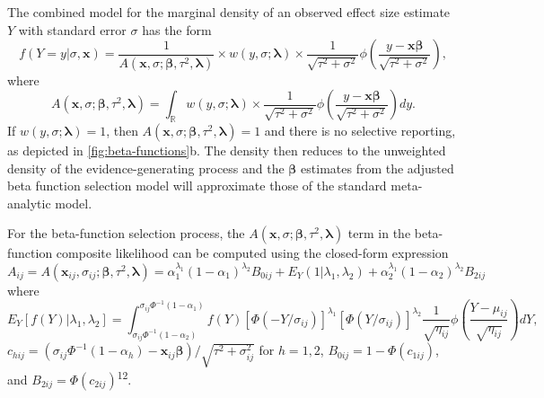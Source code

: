\documentclass[
  american,
  man, donotrepeattitle,floatsintext]{apa7}
\begin{document}
The combined model for the marginal density of an observed effect size estimate \(Y\) with standard error \(\sigma\) has the form
\begin{equation}
\label{eq:generic-selection}
f(Y = y | \sigma, \mathbf{x}) = \frac{1}{A(\mathbf{x}, \sigma; \boldsymbol\beta, \tau^2, \boldsymbol\lambda)} \times w\left(y, \sigma; \boldsymbol\lambda \right) \times \frac{1}{\sqrt{\tau^2 + \sigma^2}} \phi\left(\frac{y - \mathbf{x} \boldsymbol\beta}{\sqrt{\tau^2 + \sigma^2}}\right),
\end{equation}
where
\begin{equation}
\label{eq:generic-selection-A}
A(\mathbf{x}, \sigma; \boldsymbol\beta, \tau^2, \boldsymbol\lambda) =  \int_\mathbb{R} w\left(y, \sigma; \boldsymbol\lambda \right) \times  \frac{1}{\sqrt{\tau^2 + \sigma^2}}\phi\left(\frac{y - \mathbf{x}\boldsymbol\beta}{\sqrt{\tau^2 + \sigma^2}}\right) dy.
\end{equation}
If \(w(y, \sigma; \boldsymbol\lambda) = 1\), then \(A(\mathbf{x}, \sigma; \boldsymbol\beta, \tau^2, \boldsymbol\lambda) = 1\) and there is no selective reporting, as depicted in \ref{fig:beta-functions}b. The density then reduces to the unweighted density of the evidence-generating process and the \(\boldsymbol\beta\) estimates from the adjusted beta function selection model will approximate those of the standard meta-analytic model.

For the beta-function selection process, the \(A(\mathbf{x}, \sigma; \boldsymbol\beta, \tau^2, \boldsymbol\lambda)\) term in the beta-function composite likelihood can be computed using the closed-form expression
\begin{equation}
\label{eq:beta-function-A}
A_{ij} = A(\mathbf{x}_{ij}, \sigma_{ij}; \boldsymbol\beta, \tau^2, \boldsymbol\lambda) = \alpha_1^{\lambda_1} (1 - \alpha_1)^{\lambda_2} B_{0ij} + E_Y(1 | \lambda_1,\lambda_2) + \alpha_2^{\lambda_1} (1 - \alpha_2)^{\lambda_2} B_{2ij}
\end{equation}
where
\begin{equation}
\label{eq:beta-function-Ey}
E_Y\left[f(Y)| \lambda_1, \lambda_2\right] = \int_{\sigma_{ij} \Phi^{-1}(1 - \alpha_2)}^{\sigma_{ij} \Phi^{-1}(1 - \alpha_1)} f(Y) \left[\Phi(-Y / \sigma_{ij})\right]^{\lambda_1} \left[\Phi(Y / \sigma_{ij})\right]^{\lambda_2} \frac{1}{\sqrt{\eta_{ij}}}\phi\left(\frac{Y - \mu_{ij}}{\sqrt{\eta_{ij}}}\right) dY,
\end{equation}
\(c_{hij} = \left(\sigma_{ij} \Phi^{-1}\left(1 - \alpha_h\right) - \mathbf{x}_{ij}\boldsymbol\beta\right) / \sqrt{\tau^2 + \sigma_{ij}^2}\) for \(h = 1,2\), \(B_{0ij} = 1 - \Phi(c_{1ij})\), and \(B_{2ij} = \Phi(c_{2ij})\)\textsuperscript{12}.
\end{document}
